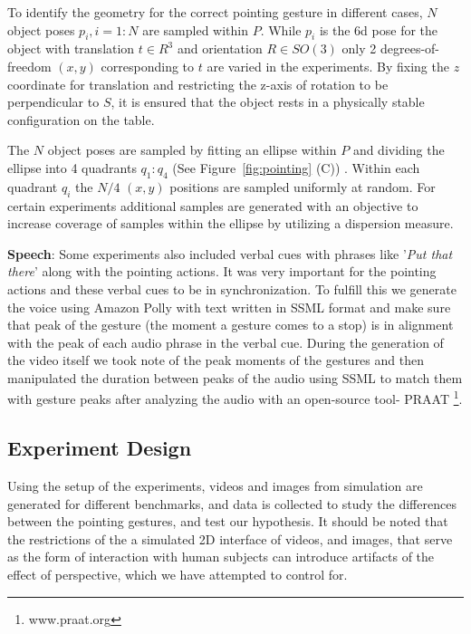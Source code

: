 To identify the geometry for the correct pointing gesture in different cases, $N$ object poses $p_i, i=1:N$ are sampled within $P$. While $p_i$ is the 6d pose for the object with translation $t \in R^3$ and orientation $R \in SO(3)$ only 2  degrees-of-freedom $(x, y)$ corresponding to $t$ are varied in the experiments. By fixing the $z$ coordinate for translation and restricting the z-axis of rotation to be perpendicular to $S$, it is ensured that the object rests in a physically stable configuration on the table.

The $N$ object poses are sampled by fitting an ellipse within $P$ and dividing the ellipse into 4 quadrants $q_1:q_4$ (See Figure~\ref{fig:pointing} (C)) . Within each quadrant $q_i$ the $N/4$ $(x,y)$ positions are sampled uniformly at random. For certain experiments additional samples are generated with an objective to increase coverage of samples within the ellipse by utilizing a dispersion measure.



\noindent\textbf{Speech}: Some experiments also included verbal cues with phrases like '\textit{Put that there}' along with the pointing actions. It was very important for the pointing actions and these verbal cues to be in synchronization. To fulfill this we generate the voice using Amazon Polly with text written in SSML format and make sure that peak of the gesture (the moment a gesture comes to a stop) is in alignment with the peak of each audio phrase in the verbal cue. During the generation of the video itself we took note of the peak moments of the gestures and then manipulated the duration between peaks of the audio using SSML to match them with gesture peaks after analyzing the audio with an open-source tool- PRAAT \footnote{www.praat.org}.


\subsection{Experiment Design}

Using the setup of the experiments, videos and images from simulation are generated for different benchmarks, and data is collected to study the differences between the pointing gestures, and test our hypothesis. It should be noted that the restrictions of the a simulated 2D interface of videos, and images, that serve as the form of interaction with human subjects can introduce artifacts of the effect of perspective, which we have attempted to control for.  


